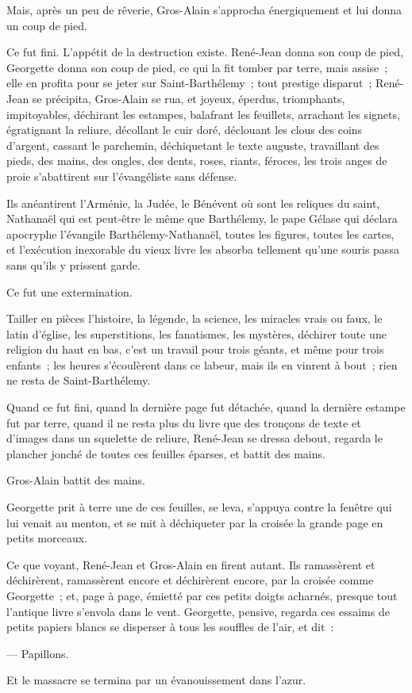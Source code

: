 \documentclass[french,twoside]{book} %
\begin{document}
Mais, après un peu de rêverie, Gros-Alain s’approcha énergiquement et lui donna un coup de pied.\par
Ce fut fini. L’appétit de la destruction existe. René-Jean donna son coup de pied, Georgette donna son coup de pied, ce qui la fit tomber par terre, mais assise ; elle en profita pour se jeter sur Saint-Barthélemy ; tout prestige disparut ; René-Jean se précipita, Gros-Alain se rua, et joyeux, éperdus, triomphants, impitoyables, déchirant les estampes, balafrant les feuillets, arrachant les signets, égratignant la reliure, décollant le cuir doré, déclouant les clous des coins d’argent, cassant le parchemin, déchiquetant le texte auguste, travaillant des pieds, des mains, des ongles, des dents, roses, riants, féroces, les trois anges de proie s’abattirent sur l’évangéliste sans défense.\par
Ils anéantirent l’Arménie, la Judée, le Bénévent où sont les reliques du saint, Nathanaël qui est peut-être le même que Barthélemy, le pape Gélase qui déclara apocryphe l’évangile Barthélemy-Nathanaël, toutes les figures, toutes les cartes, et l’exécution inexorable du vieux livre les absorba tellement qu’une souris passa sans qu’ils y prissent garde.\par
 Ce fut une extermination.\par
Tailler en pièces l’histoire, la légende, la science, les miracles vrais ou faux, le latin d’église, les superstitions, les fanatismes, les mystères, déchirer toute une religion du haut en bas, c’est un travail pour trois géants, et même pour trois enfants ; les heures s’écoulèrent dans ce labeur, mais ils en vinrent à bout ; rien ne resta de Saint-Barthélemy.\par
Quand ce fut fini, quand la dernière page fut détachée, quand la dernière estampe fut par terre, quand il ne resta plus du livre que des tronçons de texte et d’images dans un squelette de reliure, René-Jean se dressa debout, regarda le plancher jonché de toutes ces feuilles éparses, et battit des mains.\par
Gros-Alain battit des mains.\par
Georgette prit à terre une de ces feuilles, se leva, s’appuya contre la fenêtre qui lui venait au menton, et se mit à déchiqueter par la croisée la grande page en petits morceaux.\par
Ce que voyant, René-Jean et Gros-Alain en firent autant. Ils ramassèrent et déchirèrent, ramassèrent encore et déchirèrent encore, par la croisée comme Georgette ; et, page à page, émietté par ces petits doigts acharnés, presque tout l’antique livre s’envola dans le vent. Georgette, pensive, regarda ces essaims de petits papiers blancs se disperser à tous les souffles de l’air, et dit :\par
— Papillons.\par
Et le massacre se termina par un évanouissement dans l’azur.\par
\end{document}
